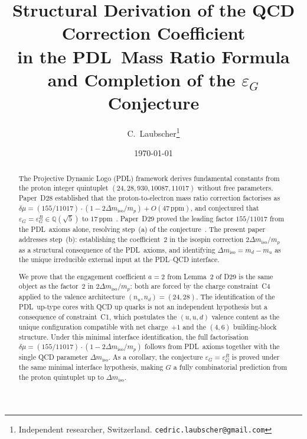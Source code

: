 \documentclass[11pt,a4paper]{article}
\theoremstyle{definition}
\newcommand{\PDL}{\textnormal{PDL}}
\newcommand{\epsg}{\varepsilon_G}
\newcommand{\epsgB}{\varepsilon_G^B}
\newcommand{\dmu}{\delta\mu}
\newcommand{\dmiso}{\Delta m_{\mathrm{iso}}}
\begin{document}
\title{Structural Derivation of the QCD Correction Coefficient\\[4pt]
in the \PDL\ Mass Ratio Formula\\[4pt]
and Completion of the $\epsg$ Conjecture}
\author{C.~Laubscher\thanks{Independent researcher, Switzerland. \texttt{cedric.laubscher@gmail.com}}\\[4pt]}
\date{\small \today}
\maketitle

\begin{abstract}
The Projective Dynamic Logo (\PDL) framework derives fundamental constants from the proton integer quintuplet $(24,28,930,10087,11017)$ without free parameters. Paper~D28 established that the proton-to-electron mass ratio correction factorises as $\dmu = (155/11017)\cdot(1-2\dmiso/m_p)+O(47\,\mathrm{ppm})$, and conjectured that $\epsg = \epsgB \in \mathbb{Q}(\sqrt{5})$ to $17\,\mathrm{ppm}$~\cite{PDL_D28_2026}. Paper~D29 proved the leading factor $155/11017$ from the \PDL\ axioms alone, resolving step~(a) of the conjecture~\cite{PDL_D29_2026}. The present paper addresses step~(b): establishing the coefficient~$2$ in the isospin correction $2\dmiso/m_p$ as a structural consequence of the \PDL\ axioms, and identifying $\dmiso = m_d - m_u$ as the unique irreducible external input at the \PDL--QCD interface.

We prove that the engagement coefficient $a=2$ from Lemma~2 of D29 is the same object as the factor~$2$ in $2\dmiso/m_p$: both are forced by the charge constraint~C4 applied to the valence architecture $(n_u,n_d)=(24,28)$. The identification of the \PDL\ up-type cores with QCD up quarks is not an independent hypothesis but a consequence of constraint~C1, which postulates the $(u,u,d)$ valence content as the unique configuration compatible with net charge~$+1$ and the $(4,6)$ building-block structure. Under this minimal interface identification, the full factorisation $\dmu = (155/11017)\cdot(1-2\dmiso/m_p)$ follows from \PDL\ axioms together with the single QCD parameter $\dmiso$. As a corollary, the conjecture $\epsg = \epsgB$ is proved under the same minimal interface hypothesis, making $G$ a fully combinatorial prediction from the proton quintuplet up to $\dmiso$.
\end{abstract}

\newpage
\tableofcontents
\end{document}
